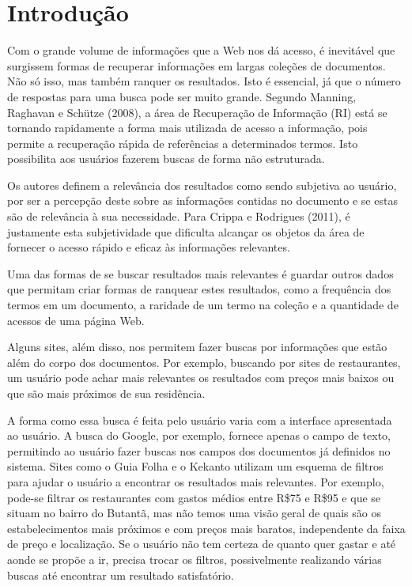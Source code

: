 \chapter{Introdução}
\label{cap:introducao}

Com o grande volume de informações que a Web nos dá acesso, é inevitável que surgissem formas de recuperar informações em largas coleções de documentos. Não só isso, mas também ranquer os resultados. Isto é essencial, já que o número de respostas para uma busca pode ser muito grande. Segundo Manning, Raghavan e Schütze (2008), a área de Recuperação de Informação (RI) está se tornando rapidamente a forma mais utilizada de acesso a informação, pois permite a recuperação rápida de referências a determinados termos. Isto possibilita aos usuários fazerem buscas de forma não estruturada. 

Os autores definem a relevância dos resultados como sendo subjetiva ao usuário, por ser a percepção deste sobre as informações contidas no documento e se estas são de relevância à sua necessidade. Para Crippa e Rodrigues (2011), é justamente esta subjetividade que dificulta alcançar os objetos da área de fornecer o acesso rápido e eficaz às informações relevantes.

Uma das formas de se buscar resultados mais relevantes é guardar outros dados que permitam criar formas de ranquear estes resultados, como a frequência dos termos em um documento, a raridade de um termo na coleção e a quantidade de acessos de uma página Web.

Alguns sites, além disso, nos permitem fazer buscas por informações que estão além do corpo dos documentos. Por exemplo, buscando por sites de restaurantes, um usuário pode achar mais relevantes os resultados com preços mais baixos ou que são mais próximos de sua residência. 

A forma como essa busca é feita pelo usuário varia com a interface apresentada ao usuário. A busca do Google, por exemplo, fornece apenas o campo de texto, permitindo ao usuário fazer buscas nos campos dos documentos já definidos no sistema. Sites como o Guia Folha e o Kekanto utilizam um esquema de filtros para ajudar o usuário a encontrar os resultados mais relevantes. Por exemplo, pode-se filtrar os restaurantes com gastos médios entre R\$75 e R\$95 e que se situam no bairro do Butantã, mas não temos uma visão geral de quais são os estabelecimentos mais próximos e com preços mais baratos, independente da faixa de preço e localização. Se o usuário não tem certeza de quanto quer gastar e até aonde se propõe a ir, precisa trocar os filtros, possivelmente realizando várias buscas até encontrar um resultado satisfatório.

